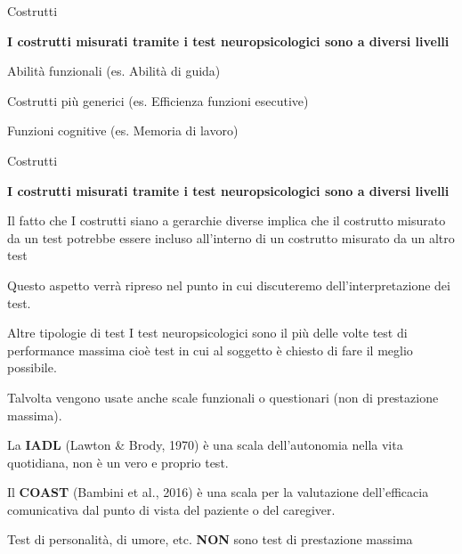 \documentclass[
  ignorenonframetext,
]{beamer}
\begin{document}
\begin{frame}{Costrutti}
\label{costrutti-5}
\begin{center}
  \textbf{I costrutti misurati tramite i test neuropsicologici sono a diversi livelli}
  \vspace{2em}

  Abilità funzionali
  (es. Abilità di guida) 
  
  {\small Costrutti più generici
  (es. Efficienza funzioni esecutive)}
  
  {\footnotesize Funzioni cognitive
  (es. Memoria di lavoro)}
  
\end{center}
\end{frame}

\begin{frame}{Costrutti}
\label{costrutti-6}
\begin{center}
  \textbf{I costrutti misurati tramite i test neuropsicologici sono a diversi livelli}
\end{center}
\vspace{2em}

Il fatto che I costrutti siano a gerarchie diverse implica che il
costrutto misurato da un test potrebbe essere incluso all'interno di un
costrutto misurato da un altro test

Questo aspetto verrà ripreso nel punto in cui discuteremo
dell'interpretazione dei test.
\end{frame}

\begin{frame}{Altre tipologie di test}
\label{altre-tipologie-di-test}
I test neuropsicologici sono il più delle volte test di performance
massima cioè test in cui al soggetto è chiesto di fare il meglio
possibile.

Talvolta vengono usate anche scale funzionali o questionari (non di
prestazione massima).

La \textbf{IADL} (Lawton \& Brody, 1970) è una scala dell'autonomia
nella vita quotidiana, non è un vero e proprio test.

Il \textbf{COAST} (Bambini et al., 2016) è una scala per la valutazione
dell'efficacia comunicativa dal punto di vista del paziente o del
caregiver.

Test di personalità, di umore, etc. \textbf{NON} sono test di
prestazione massima
\end{frame}
\end{document}
